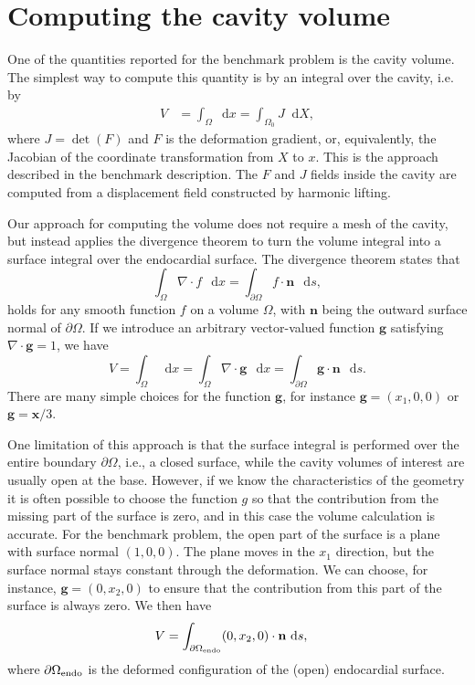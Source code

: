\documentclass[a4paper,10pt]{article}
\newcommand{\dif}{\mathop{}\!\mathrm{d}}
\newcommand{\dx}{\dif{}x}
\newcommand{\dX}{\dif{}X}
\newcommand{\ds}{\dif{}s}
\begin{document}
\section{Computing the cavity volume}
One of the quantities reported for the benchmark problem is the cavity volume.
The simplest way to compute this quantity is by an integral over the cavity, i.e.
by
\begin{align}
V &= \int_\Omega \dx = \int_{\Omega_0} J \dX,
\label{vol0}\end{align}
where $J=\det(F)$ and $F$ is the deformation gradient, or,
equivalently, the Jacobian of the coordinate transformation from $X$
to $x$. This is the approach described in the benchmark description.
The $F$ and $J$ fields inside the cavity are computed from a displacement field
constructed by harmonic lifting.

Our approach for computing the volume does not require a mesh of the cavity,
but instead applies the divergence theorem to turn the volume integral into
a surface integral over the endocardial surface. The divergence theorem states
that
\[
\int_\Omega \nabla\cdot f \, \dx = \int_{\partial\Omega} f\cdot \mathbf{n} \, \ds,
\]
holds for any smooth function $f$ on a volume $\Omega$, with $\mathbf{n}$ being the
outward surface normal of $\partial\Omega$. If we introduce an
arbitrary vector-valued function $\mathbf{g}$ satisfying $\nabla\cdot \mathbf{g} = 1$, we have
\[
V =\int_{\Omega} \dx = \int_{\Omega}\nabla\cdot \mathbf{g} \, \dx
= \int_{\partial\Omega}\mathbf{g}\cdot\mathbf{n} \, \ds .
\]
There are many simple choices for the function $\mathbf{g}$, for instance $\mathbf{g}=(x_1,0,0)$ or
$\mathbf{g}=\mathbf{x}/3$.

One limitation of this approach is that the surface integral is performed over the
entire boundary $\partial\Omega$, i.e., a closed surface, while the cavity volumes
of interest are usually open at the base. However, if we know the characteristics
of the geometry it is often possible to choose the function $g$ so that the
contribution from the missing part of the surface is zero, and in this case the
volume calculation is accurate. For the benchmark problem, the open
part of the surface is a plane with surface normal $(1,0,0)$. The plane moves
in the $x_1$ direction, but the surface normal stays constant through the
deformation. We can choose, for instance, $\mathbf{g}=(0,x_2,0)$ to ensure that the
contribution from this part of the surface is always zero. We then have
\begin{align}
V &= \int_{\partial\Omega_{\rm endo}}(0,x_2,0) \cdot\mathbf{n} \, \ds ,
\label{vol1}\end{align}
where $\partial\Omega_{\rm endo}$ is the deformed configuration of the (open)
endocardial surface.
\end{document}

